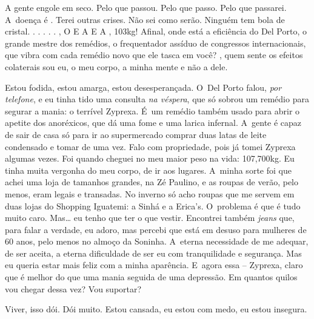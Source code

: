A gente engole em seco. Pelo que passou. Pelo que passo. Pelo que
passarei. A~doença é . Terei outras crises. Não sei como serão.
Ninguém tem bola de cristal.  .  .  
 .   .     
  .      
,  O  E A     E A ,
103kg! Afinal, onde está a eficiência do Del Porto, o grande mestre dos
remédios, o frequentador assíduo de congressos internacionais, que vibra
com cada remédio novo que ele tasca em você?    , quem
sente os efeitos colaterais sou eu, o meu corpo, a minha mente e não a
dele.

Estou fodida, estou amarga, estou desesperançada. O~Del Porto falou,
\emph{por telefone}, e eu tinha tido uma consulta \emph{na véspera}, que
só sobrou um remédio para segurar a mania: o terrível Zyprexa. É~um
remédio também usado para abrir o apetite dos anoréxicos, que dá uma
fome e uma larica infernal. A~gente é capaz de sair de casa só para ir
ao supermercado comprar duas latas de leite condensado e tomar de uma
vez. Falo com propriedade, pois já tomei Zyprexa algumas vezes. Foi
quando cheguei no meu maior peso na vida: 107,700kg. Eu tinha muita
vergonha do meu corpo, de ir aos lugares. A~minha sorte foi que achei
uma loja de tamanhos grandes, na Zé Paulino, e as roupas de verão, pelo
menos, eram legais e transadas. No inverno só acho roupas que me servem
em duas lojas do Shopping Iguatemi: a Sinhá e a Erica's. O~problema é
que é tudo muito caro. Mas… eu tenho que ter o que vestir.
Encontrei também \emph{jeans} que, para falar a verdade, eu adoro, mas
percebi que está em desuso para mulheres de 60 anos, pelo menos no
almoço da Soninha. A~eterna necessidade de me adequar, de ser aceita, a
eterna dificuldade de ser eu com tranquilidade e segurança. Mas eu
queria estar mais feliz com a minha aparência. E~agora essa -- Zyprexa,
claro que é melhor do que uma mania seguida de uma depressão. Em quantos
quilos vou chegar dessa vez? Vou suportar?

Viver, isso dói. Dói muito. Estou cansada, eu estou com medo, eu estou
insegura.

